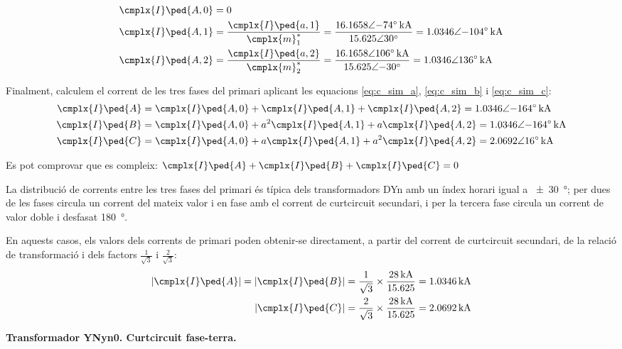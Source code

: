 \begin{exemple}[\CCasimSecTrafo{}]
    \begin{align*}
        \cmplx{I}\ped{A,0} &= 0 \\
        \cmplx{I}\ped{A,1} &= \frac{\cmplx{I}\ped{a,1}}{\cmplx{m}^*_1} = \frac{\complexqty{16,1658:-74}{kA}}{\complexnum{15,625:30}} =  \complexqty{1,0346:-104}{kA} \\
        \cmplx{I}\ped{A,2} &= \frac{\cmplx{I}\ped{a,2}}{\cmplx{m}^*_2} = \frac{\complexqty{16,1658:106}{kA}}{\complexnum{15,625:-30}} = \complexqty{1,0346:136}{kA}
    \end{align*}

    Finalment, calculem el corrent de les tres fases del primari aplicant les equacions \eqref{eq:c_sim_a}, \eqref{eq:c_sim_b} i \eqref{eq:c_sim_c}:
     \begin{align*}
        \cmplx{I}\ped{A} &= \cmplx{I}\ped{A,0} + \cmplx{I}\ped{A,1} + \cmplx{I}\ped{A,2} = \complexqty{1,0346:-164}{kA} \\
        \cmplx{I}\ped{B} &= \cmplx{I}\ped{A,0} + a^2 \cmplx{I}\ped{A,1} + a \cmplx{I}\ped{A,2} = \complexqty{1,0346:-164}{kA} \\
        \cmplx{I}\ped{C} &= \cmplx{I}\ped{A,0} + a \cmplx{I}\ped{A,1} + a^2 \cmplx{I}\ped{A,2} = \complexqty{2,0692:16}{kA}
    \end{align*}

    Es pot comprovar que es compleix: $\cmplx{I}\ped{A} + \cmplx{I}\ped{B} + \cmplx{I}\ped{C} = 0$

    La distribució de corrents entre les tres fases del primari és típica dels transformadors DYn amb un índex horari igual a \qty{+-30}{\degree}; per dues de les fases circula un corrent del mateix valor i en fase amb el corrent de curtcircuit secundari, i per la tercera fase circula un corrent de valor doble i desfasat \qty{180}{\degree}.

    En aquests casos, els valors dels corrents de primari poden obtenir-se directament, a partir del corrent de curtcircuit secundari, de la relació de transformació i dels factors $\frac{1}{\sqrt{3}}$ i  $\frac{2}{\sqrt{3}}$:
    \begin{align*}
        |\cmplx{I}\ped{A}| = |\cmplx{I}\ped{B}| = \frac{1}{\sqrt{3}} \times \frac{\qty{28}{kA}}{\num{15,625}} = \qty{1,0346}{kA} \\
        |\cmplx{I}\ped{C}|= \frac{2}{\sqrt{3}} \times \frac{\qty{28}{kA}}{\num{15,625}} = \qty{2,0692}{kA}
    \end{align*}


    \textbf{ Transformador YNyn0. Curtcircuit fase-terra.}


\end{exemple}
